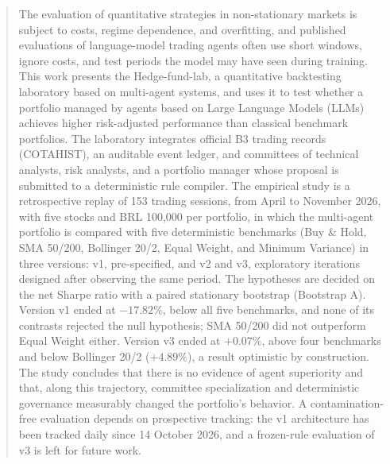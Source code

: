 \documentclass{eic-bcc-tcc}
\begin{document}
\begin{abstract}
The evaluation of quantitative strategies in non-stationary markets is subject to costs, regime dependence, and overfitting, and published evaluations of language-model trading agents often use short windows, ignore costs, and test periods the model may have seen during training. This work presents the Hedge-fund-lab, a quantitative backtesting laboratory based on multi-agent systems, and uses it to test whether a portfolio managed by agents based on Large Language Models (LLMs) achieves higher risk-adjusted performance than classical benchmark portfolios. The laboratory integrates official B3 trading records (COTAHIST), an auditable event ledger, and committees of technical analysts, risk analysts, and a portfolio manager whose proposal is submitted to a deterministic rule compiler. The empirical study is a retrospective replay of 153 trading sessions, from April to November 2026, with five stocks and BRL 100,000 per portfolio, in which the multi-agent portfolio is compared with five deterministic benchmarks (Buy \& Hold, SMA 50/200, Bollinger 20/2, Equal Weight, and Minimum Variance) in three versions: v1, pre-specified, and v2 and v3, exploratory iterations designed after observing the same period. The hypotheses are decided on the net Sharpe ratio with a paired stationary bootstrap (Bootstrap A). Version v1 ended at $-17.82\%$, below all five benchmarks, and none of its contrasts rejected the null hypothesis; SMA 50/200 did not outperform Equal Weight either. Version v3 ended at $+0.07\%$, above four benchmarks and below Bollinger 20/2 ($+4.89\%$), a result optimistic by construction. The study concludes that there is no evidence of agent superiority and that, along this trajectory, committee specialization and deterministic governance measurably changed the portfolio's behavior. A contamination-free evaluation depends on prospective tracking: the v1 architecture has been tracked daily since 14 October 2026, and a frozen-rule evaluation of v3 is left for future work.
\end{abstract}

\listoffigurespage

\begingroup
  \let\cleardoublepage\clearpage
  \listoftablespage
  \listofacronymspage
\endgroup

\tableofcontentspage

\mainmatter









\backmatter


\appendix

\end{document}
